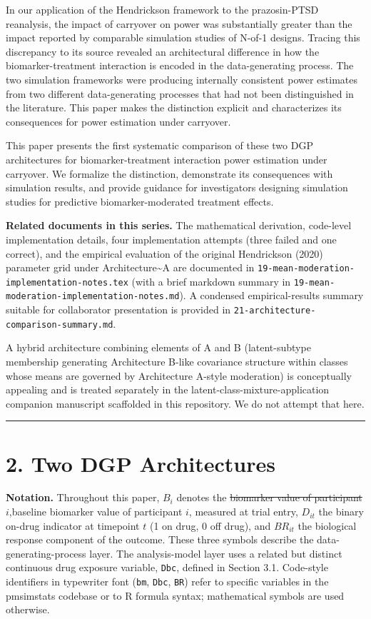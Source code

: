 \documentclass[
]{article}
\begin{document}
\textcolor{addblue}{In our application of the Hendrickson framework to the prazosin-PTSD reanalysis, the impact of carryover on power was substantially greater than the impact reported by comparable simulation studies of N-of-1 designs. Tracing this discrepancy to its source revealed an architectural difference in how the biomarker-treatment interaction is encoded in the data-generating process. The two simulation frameworks were producing internally consistent power estimates from two different data-generating processes that had not been distinguished in the literature. This paper makes the distinction explicit and characterizes its consequences for power estimation under carryover.}

This paper presents the first systematic comparison of these two
DGP architectures for biomarker-treatment interaction power
estimation under carryover. We formalize the distinction,
demonstrate its consequences with simulation results, and
provide guidance for investigators designing simulation studies
for predictive biomarker-moderated treatment effects.

\textbf{Related documents in this series.} The mathematical
derivation, code-level implementation details, four
implementation attempts (three failed and one correct), and the
empirical evaluation of the original Hendrickson (2020)
parameter grid under Architecture\textasciitilde A are documented in
\texttt{19-mean-moderation-implementation-notes.tex} (with a
brief markdown summary in
\texttt{19-mean-moderation-implementation-notes.md}). A
condensed empirical-results summary suitable for collaborator
presentation is provided in
\texttt{21-architecture-comparison-summary.md}.

\textcolor{addblue}{A hybrid architecture combining elements of A and B (latent-subtype membership generating Architecture B-like covariance structure within classes whose means are governed by Architecture A-style moderation) is conceptually appealing and is treated separately in the latent-class-mixture-application companion manuscript scaffolded in this repository. We do not attempt that here.}

\bigskip\noindent

\rule{\textwidth}{0.4pt}\bigskip

\section{2. Two DGP Architectures}

\textbf{Notation.} Throughout this paper, \(B_i\) denotes the
\textcolor{delred}{\sout{biomarker value of participant $i$}},\textcolor{addblue}{baseline biomarker value of participant $i$, measured at trial entry}, \(D_{it}\) the binary on-drug
indicator at timepoint \(t\) (1 on drug, 0 off drug), and
\(BR_{it}\) the biological response component of the outcome.
These three symbols describe the data-generating-process layer.
The analysis-model layer uses a related but distinct continuous
drug exposure variable, \texttt{Dbc}, defined in Section 3.1.
Code-style identifiers in typewriter font (\texttt{bm},
\texttt{Dbc}, \texttt{BR}) refer to specific variables in the
pmsimstats codebase or to R formula syntax; mathematical
symbols are used otherwise.
\end{document}
